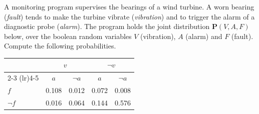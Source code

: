 \documentclass[11pt, a4paper]{exam}
\begin{document}
\begin{exercises}[1, 2, 3, 5]
A monitoring program supervises the bearings of a wind turbine. A worn bearing (\emph{fault}) tends to make the turbine vibrate (\emph{vibration}) and to trigger the alarm of a diagnostic probe (\emph{alarm}). The program holds the joint distribution $\mathbf{P}(V, A, F)$ below, over the boolean random variables $V$ (vibration), $A$ (alarm) and $F$ (fault). Compute the following probabilities.

\begin{center}
    \begin{tabular}{lcccc}
        \toprule
        & \multicolumn{2}{c}{$v$} & \multicolumn{2}{c}{$\neg v$} \\
        \cmidrule(lr){2-3} \cmidrule(lr){4-5}
        & $a$ & $\neg a$ & $a$ & $\neg a$ \\
        \midrule
        $f$ & 0.108 & 0.012 & 0.072 & 0.008 \\
        $\neg f$ & 0.016 & 0.064 & 0.144 & 0.576 \\
        \bottomrule
    \end{tabular}
\end{center}

\end{exercises}
\end{document}
